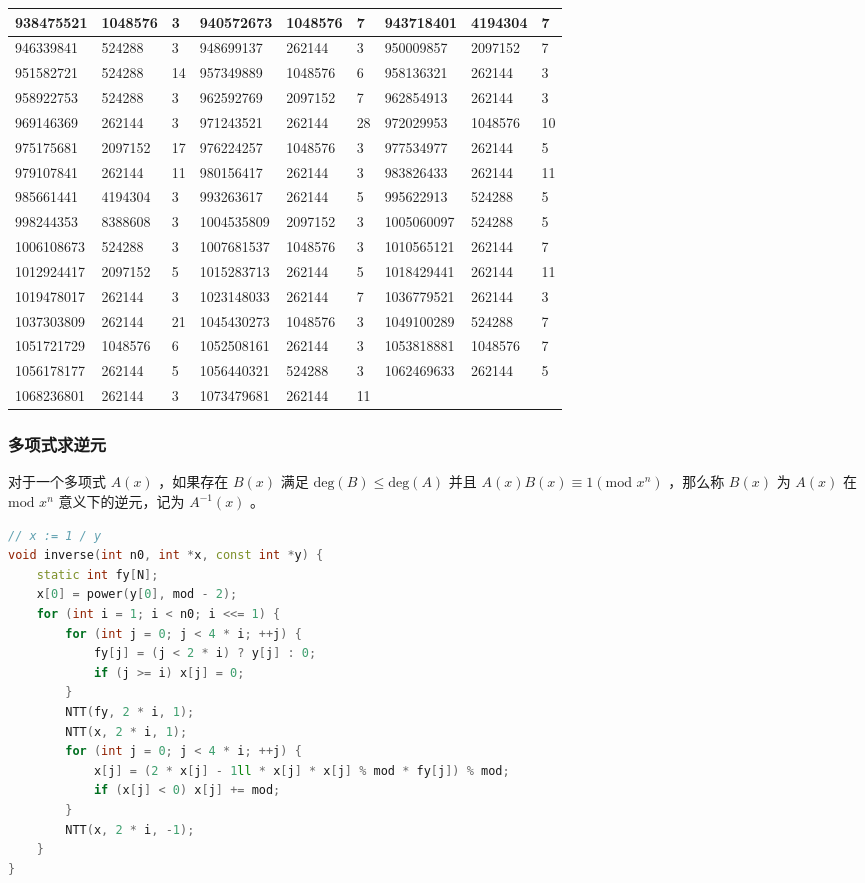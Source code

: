 \documentclass{article}
\begin{document}
\begin{longtable}{|l|l|l||l|l|l||l|l|l|}
\hline
938475521 & 1048576 & 3 & 940572673 & 1048576 & 7 & 943718401 & 4194304 & 7 \\
\hline
946339841 & 524288 & 3 & 948699137 & 262144 & 3 & 950009857 & 2097152 & 7 \\
\hline
951582721 & 524288 & 14 & 957349889 & 1048576 & 6 & 958136321 & 262144 & 3 \\
\hline
958922753 & 524288 & 3 & 962592769 & 2097152 & 7 & 962854913 & 262144 & 3 \\
\hline
969146369 & 262144 & 3 & 971243521 & 262144 & 28 & 972029953 & 1048576 & 10 \\
\hline
975175681 & 2097152 & 17 & 976224257 & 1048576 & 3 & 977534977 & 262144 & 5 \\
\hline
979107841 & 262144 & 11 & 980156417 & 262144 & 3 & 983826433 & 262144 & 11 \\
\hline
985661441 & 4194304 & 3 & 993263617 & 262144 & 5 & 995622913 & 524288 & 5 \\
\hline
998244353 & 8388608 & 3 & 1004535809 & 2097152 & 3 & 1005060097 & 524288 & 5 \\
\hline
1006108673 & 524288 & 3 & 1007681537 & 1048576 & 3 & 1010565121 & 262144 & 7 \\
\hline
1012924417 & 2097152 & 5 & 1015283713 & 262144 & 5 & 1018429441 & 262144 & 11 \\
\hline
1019478017 & 262144 & 3 & 1023148033 & 262144 & 7 & 1036779521 & 262144 & 3 \\
\hline
1037303809 & 262144 & 21 & 1045430273 & 1048576 & 3 & 1049100289 & 524288 & 7 \\
\hline
1051721729 & 1048576 & 6 & 1052508161 & 262144 & 3 & 1053818881 & 1048576 & 7 \\
\hline
1056178177 & 262144 & 5 & 1056440321 & 524288 & 3 & 1062469633 & 262144 & 5 \\
\hline
1068236801 & 262144 & 3 & 1073479681 & 262144 & 11 & & & \\
\hline
\end{longtable}

\subsubsection{多项式求逆元}

对于一个多项式 $A(x)$ ，如果存在 $B(x)$ 满足 $\text{deg}(B) \leq \text{deg}(A)$ 并且 $A(x)B(x) \equiv 1 (\text{mod } x^n)$ ，那么称 $B(x)$ 为 $A(x)$ 在 $\text{mod } x^n$ 意义下的逆元，记为 $A^{-1}(x)$ 。

\begin{lstlisting}[language=C++]
// x := 1 / y
void inverse(int n0, int *x, const int *y) {
	static int fy[N];
	x[0] = power(y[0], mod - 2);
	for (int i = 1; i < n0; i <<= 1) {
		for (int j = 0; j < 4 * i; ++j) {
			fy[j] = (j < 2 * i) ? y[j] : 0;
			if (j >= i) x[j] = 0;
		}
		NTT(fy, 2 * i, 1);
		NTT(x, 2 * i, 1);
		for (int j = 0; j < 4 * i; ++j) {
			x[j] = (2 * x[j] - 1ll * x[j] * x[j] % mod * fy[j]) % mod;
			if (x[j] < 0) x[j] += mod;
		}
		NTT(x, 2 * i, -1);
	}
}
\end{lstlisting}
\end{document}
